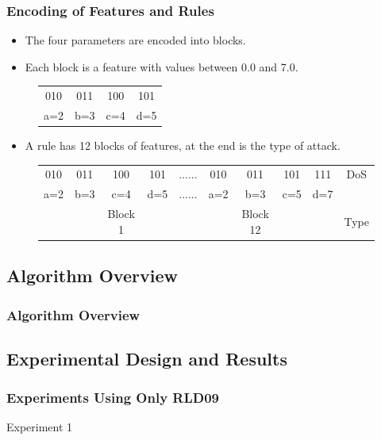\documentclass{beamer}
\begin{document}
\begin{frame}
	\frametitle{Encoding of Features and Rules}
	\begin{itemize}
	\item The four parameters are encoded into blocks.
	\item Each block is a feature with values between 0.0 and 7.0.
	\end{itemize}
	
\begin{figure}
\begin{tabular}{|cccc|} \hline
010 & 011 & 100 & 101\\
a=2 & b=3 & c=4 & d=5\\
\hline\end{tabular}
\end{figure}

	\begin{itemize}
	\item A rule has 12 blocks of features, at the end is the type of attack.
	\end{itemize}

\begin{figure}
\begin{tabular}{|cccc|c|cccc|c|} \hline
010 & 011 & 100 & 101   & ...... & 010 & 011 & 101 & 111   & DoS\\
a=2 & b=3 & c=4 & d=5   & ...... & a=2 & b=3 & c=5 & d=7   &\\ 
    &     & Block 1&    &        &     & Block 12& &       & Type\\
\hline\end{tabular}
\end{figure}

\end{frame}


\subsection{Algorithm Overview}

\begin{frame}
	\frametitle{Algorithm Overview}
	
\end{frame}


\subsection{Experimental Design and Results}

\begin{frame}
	\frametitle{Experiments Using Only RLD09}
Experiment 1
	
\end{frame}
\end{document}
